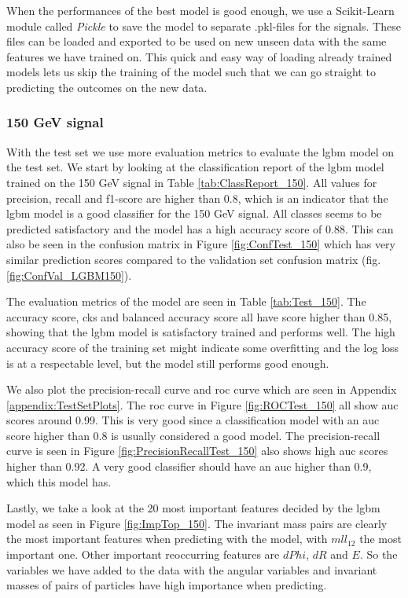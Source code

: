 \documentclass[a4paper, american, 12pt]{report}
\begin{document}
	When the performances of the best model is good enough, we use a Scikit-Learn module called \textit{Pickle} to save the model to separate .pkl-files for the signals. These files can be loaded and exported to be used on new unseen data with the same features we have trained on. This quick and easy way of loading already trained models lets us skip the training of the model such that we can go straight to predicting the outcomes on the new data.
	
	
	\subsubsection{150 GeV signal}
	\label{subsect:Result-Test150}
	With the test set we use more evaluation metrics to evaluate the \acrshort{lgbm} model on the test set. We start by looking at the classification report of the \acrshort{lgbm} model trained on the 150 GeV signal in Table \ref{tab:ClassReport_150}. All values for precision, recall and f1-score are higher than 0.8, which is an indicator that the \acrshort{lgbm} model is a good classifier for the 150 GeV signal. All classes seems to be predicted satisfactory and the model has a high accuracy score of 0.88. This can also be seen in the confusion matrix in Figure \ref{fig:ConfTest_150} which has very similar prediction scores compared to the validation set confusion matrix (fig. \ref{fig:ConfVal_LGBM150}). 
	
	The evaluation metrics of the model are seen in Table \ref{tab:Test_150}. The accuracy score, \acrshort{cks} and balanced accuracy score all have score higher than 0.85, showing that the \acrshort{lgbm} model is satisfactory trained and performs well. The high accuracy score of the training set might indicate some overfitting and the log loss is at a respectable level, but the model still performs good enough.
	
	We also plot the precision-recall curve and \acrshort{roc} curve which are seen in Appendix \ref{appendix:TestSetPlots}. The \acrshort{roc} curve in Figure \ref{fig:ROCTest_150} all show \acrshort{auc} scores around 0.99. This is very good since a classification model with an \acrshort{auc} score higher than 0.8 is usually considered a good model. The precision-recall curve is seen in Figure \ref{fig:PrecisionRecallTest_150} also shows high \acrshort{auc} scores higher than 0.92. A very good classifier should have an \acrshort{auc} higher than 0.9, which this model has.
	
	Lastly, we take a look at the 20 most important features decided by the \acrshort{lgbm} model as seen in Figure \ref{fig:ImpTop_150}. The invariant mass pairs are clearly the most important features when predicting with the model, with $mll_12$ the most important one. Other important reoccurring features are $dPhi$, $dR$ and $E$. So the variables we have added to the data with the angular variables and invariant masses of pairs of particles have high importance when predicting.
	
\end{document}
